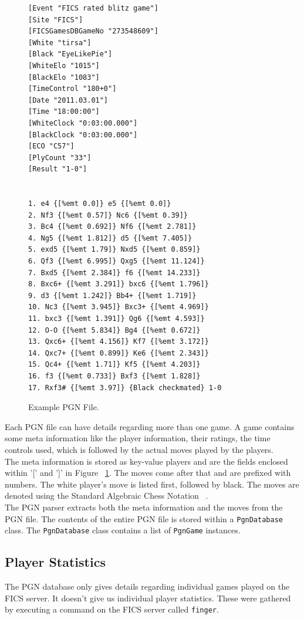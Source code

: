 \documentclass{article}
\begin{document}
\begin{figure}[htp]
\begin{center}
\begin{verbatim}
[Event "FICS rated blitz game"]
[Site "FICS"]
[FICSGamesDBGameNo "273548609"]
[White "tirsa"]
[Black "EyeLikePie"]
[WhiteElo "1015"]
[BlackElo "1083"]
[TimeControl "180+0"]
[Date "2011.03.01"]
[Time "18:00:00"]
[WhiteClock "0:03:00.000"]
[BlackClock "0:03:00.000"]
[ECO "C57"]
[PlyCount "33"]
[Result "1-0"]


1. e4 {[%emt 0.0]} e5 {[%emt 0.0]} 
2. Nf3 {[%emt 0.57]} Nc6 {[%emt 0.39]} 
3. Bc4 {[%emt 0.692]} Nf6 {[%emt 2.781]} 
4. Ng5 {[%emt 1.812]} d5 {[%emt 7.405]} 
5. exd5 {[%emt 1.79]} Nxd5 {[%emt 0.859]} 
6. Qf3 {[%emt 6.995]} Qxg5 {[%emt 11.124]} 
7. Bxd5 {[%emt 2.384]} f6 {[%emt 14.233]} 
8. Bxc6+ {[%emt 3.291]} bxc6 {[%emt 1.796]} 
9. d3 {[%emt 1.242]} Bb4+ {[%emt 1.719]} 
10. Nc3 {[%emt 3.945]} Bxc3+ {[%emt 4.969]} 
11. bxc3 {[%emt 1.391]} Qg6 {[%emt 4.593]} 
12. O-O {[%emt 5.834]} Bg4 {[%emt 0.672]} 
13. Qxc6+ {[%emt 4.156]} Kf7 {[%emt 3.172]} 
14. Qxc7+ {[%emt 0.899]} Ke6 {[%emt 2.343]} 
15. Qc4+ {[%emt 1.71]} Kf5 {[%emt 4.203]} 
16. f3 {[%emt 0.733]} Bxf3 {[%emt 1.828]} 
17. Rxf3# {[%emt 3.97]} {Black checkmated} 1-0

\end{verbatim}
\end{center}
\caption{Example PGN File.}
\label{fig:pgn}
\end{figure}

Each PGN file can have details regarding more than one game. A game contains some meta information like the player information, their ratings, the time controls used, which is followed by the actual moves played by the players.\\

The meta information is stored as key-value players and are the fields enclosed within '[' and ']' in Figure ~\ref{fig:pgn}. The moves come after that and are prefixed with numbers. The white player's move is listed first, followed by black. The moves are denoted using the Standard Algebraic Chess Notation ~\cite{wiki:san}. \\

The PGN parser extracts both the meta information and the moves from the PGN file. The contents of the entire PGN file is stored within a \verb=PgnDatabase= class. The \verb=PgnDatabase= class contains a list of \verb=PgnGame= instances.

\subsection{Player Statistics}
\label{sec:pstats}
The PGN database only gives details regarding individual games played on the FICS server. It doesn't give us individual player statistics. These were gathered by executing a command on the FICS server called \verb=finger=. 
\end{document}
